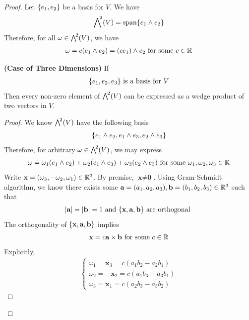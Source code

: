 \documentclass{report}
\begin{document}
\begin{proof}
Let  $\{ e_1,e_2 \}$ be a basis for $V$.  We have 
\begin{align*}
\extp^2(V)=\operatorname{span} \set{e_1 \wedge  e_2}
\end{align*}
Therefore, for all $\omega \in \extp^2(V)$, we have 
\begin{align*}
\omega  = c(e_1 \wedge  e_2)=(ce_1) \wedge  e_2 \text{ for some }c\in\mathbb{R}  
\end{align*}
\begin{theorem}
\textbf{(Case of Three Dimensions)} If 
\begin{align*}
  \{ e_1,e_2,e_3 \}\text{ is a basis for }V
\end{align*}
Then every non-zero element of $\extp^2(V)$ can be expressed as a wedge product of two vectors in $V$. 
\end{theorem}
\begin{proof}
We know $\extp^2(V)$ have the following basis  
\begin{align*}
\{ e_1\wedge  e_2, e_1 \wedge  e_3, e_2 \wedge  e_3 \} 
\end{align*}
Therefore, for arbitrary $\omega  \in \extp^2(V)$, we may express 
\begin{align*}
\omega = \omega_1 (e_1 \wedge e_2)+ \omega_2 (e_1 \wedge  e_3) + \omega_3 (e_2 \wedge  e_3)  \text{ for some }\omega_1,\omega_2,\omega_3 \in\mathbb{R}
\end{align*}
Write $\textbf{x}=(\omega_3,-\omega_2,\omega_1)\in\mathbb{R}^3$. By premise, $\textbf{x}\neq \textbf{0}$. Using Gram-Schmidt algorithm, we know there exists some $\textbf{a}=(a_1,a_2,a_3),\textbf{b}=(b_1,b_2,b_3)\in\mathbb{R}^3$ such that 
\begin{align*}
\left|\textbf{a}\right|=\left|\textbf{b}\right|=1 \text{ and }\{ \textbf{x},\textbf{a},\textbf{b} \}\text{ are orthogonal }
\end{align*}
The orthogonality of $\{ \textbf{x},\textbf{a},\textbf{b} \}$ implies 
\begin{align*}
\textbf{x}= c \textbf{a}\times \textbf{b}\text{ for some }c\in\mathbb{R}
\end{align*}
Explicitly, 
\begin{align*}
\begin{cases}
  \omega_1 = \textbf{x}_3 = c(a_1b_2-a_2b_1) \\
  \omega_2= - \textbf{x}_2= c(a_1b_3-a_3b_1) \\
  \omega_3= \textbf{x}_1= c(a_2b_3-a_3b_2)
\end{cases}
\end{align*}

\end{proof}
\end{proof}
\end{document}
